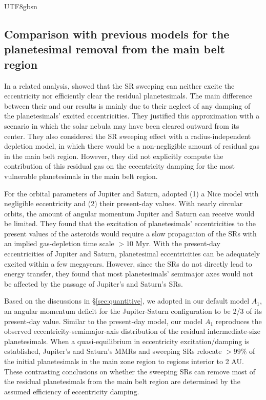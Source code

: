 \documentclass[tighten]{aastex6}
\begin{document}
\begin{CJK*}{UTF8}{gbsn}
\subsection{Comparison with previous models for the planetesimal
removal from the main belt region}
\label{sec:sum2}

In a related analysis, \cite{obrien2007} showed 
that the SR sweeping can neither excite the eccentricity nor 
efficiently clear the residual planetesimals. The main difference
between their and our results is mainly due to their neglect of  
any damping of the planetesimals' excited eccentricities. 
They justified this approximation with a scenario in which the solar 
nebula may have been cleared outward from its center.  They also 
considered the SR sweeping effect with a radius-independent 
depletion model, in which there would be a non-negligible amount 
of residual gas in the main belt region.  However, they did not 
explicitly compute the contribution of this residual gas on the 
eccentricity damping for the most vulnerable planetesimals
in the main belt region. 

For the orbital parameters of Jupiter and Saturn, \cite{obrien2007} 
adopted (1) a Nice model with negligible eccentricity \citep{gomes2005} 
and (2) their present-day values. With nearly circular orbits, the 
amount of angular momentum Jupiter and Saturn can receive would be 
limited.  They found that the excitation of planetesimals' 
eccentricities to the present values of the asteroids would require 
a slow propagation of the SRs with an implied gas-depletion time 
scale $>10$ Myr.  With the present-day eccentricities of Jupiter 
and Saturn, planetesimal eccentricities can be adequately excited 
within a few megayears.  However, since the SRs do not directly lead 
to energy transfer, they found that most planetesimals' semimajor axes would not be affected by the passage of Jupiter's and 
Saturn's SRs.  

Based on the discussions in \S\ref{sec:quantitive}, we adopted in our
default model $A_1$, an angular momentum deficit for the Jupiter-Saturn configuration 
to be 2/3 of its present-day value.  Similar to the \cite{obrien2007} 
present-day model, our model $A_1$ reproduces the observed eccentricity-semimajor-axis distribution of the residual intermediate-size planetesimals. 
When a quasi-equilibrium in eccentricity excitation/damping is established, 
Jupiter's and Saturn's MMRs and sweeping SRs relocate $>99\%$ of the 
initial planetesimals in the main zone region to regions interior to 2 AU. 
These contrasting conclusions on whether the sweeping SRs can 
remove most of the residual planetesimals from the main belt region are determined by
the assumed efficiency of eccentricity damping.  


\end{CJK*}
\end{document}

